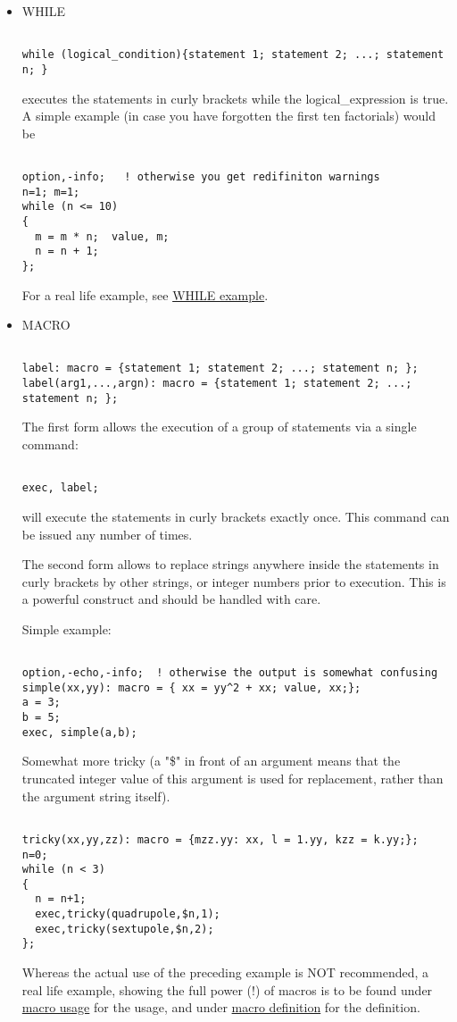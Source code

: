 \begin{itemize}
	\item WHILE
\begin{verbatim}

while (logical_condition){statement 1; statement 2; ...; statement n; }
\end{verbatim}  
executes the statements in curly brackets while the logical\_expression
is true. A simple example (in case you have forgotten the first ten
factorials) would be  
\begin{verbatim}

option,-info;   ! otherwise you get redifiniton warnings
n=1; m=1;
while (n <= 10)
{
  m = m * n;  value, m;
  n = n + 1;
};
\end{verbatim}

For a real life example, see \href{foot.html}{WHILE example}.

	\item MACRO

\begin{verbatim}

label: macro = {statement 1; statement 2; ...; statement n; };
label(arg1,...,argn): macro = {statement 1; statement 2; ...; statement n; };
\end{verbatim} 
The first form allows the execution of a group of statements via a
single command:  
\begin{verbatim}

exec, label;
\end{verbatim} 
will execute the statements in curly brackets exactly once. This command
can be issued any number of times.  

The second form allows to replace strings anywhere inside the statements
in curly brackets by other strings, or integer numbers prior to
execution. This is a powerful construct and should be handled with care.  

Simple example: 
\begin{verbatim}

option,-echo,-info;  ! otherwise the output is somewhat confusing
simple(xx,yy): macro = { xx = yy^2 + xx; value, xx;};
a = 3;
b = 5;
exec, simple(a,b);
\end{verbatim}

Somewhat more tricky (a "\$" in front of an argument means that the
truncated integer value of this argument is used for replacement, rather
than the argument string itself).  
\begin{verbatim}

tricky(xx,yy,zz): macro = {mzz.yy: xx, l = 1.yy, kzz = k.yy;};
n=0;
while (n < 3)
{
  n = n+1;
  exec,tricky(quadrupole,$n,1);
  exec,tricky(sextupole,$n,2);
};
\end{verbatim} 
Whereas the actual use of the preceding example is NOT recommended,
a real life example, showing the full power (!) of macros is to be
found under \href{foot.html}{macro usage} for the usage, and
under \href{foot.html#macro}{macro definition} for the
definition.



\end{itemize}
